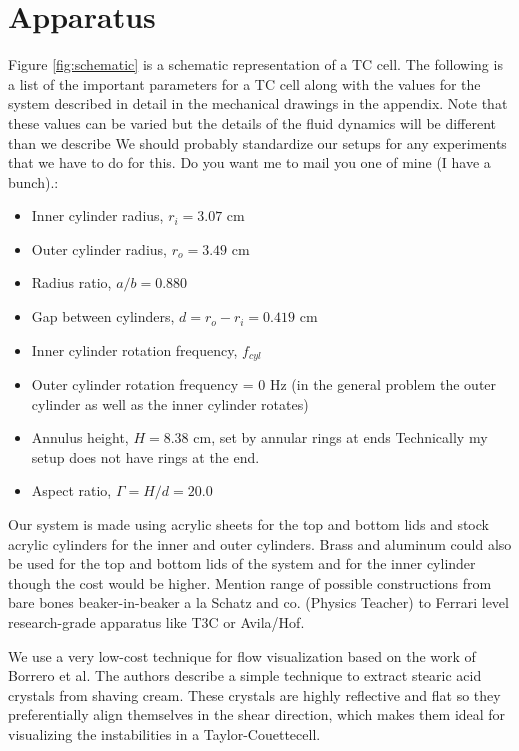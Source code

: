 \documentclass[%
reprint,
 amsmath,amssymb,
 aps,
prb,
floatfix,
longbibliography,
notitlepage
]{revtex4-1}
\newcommand{\DB}[1]{{\color{red}#1}} %
\newcommand{\TC}{Taylor-Couette}
\newcommand{\gap}{\ensuremath{d}} %
\newcommand{\height}{\ensuremath{H}} %
\newcommand{\rad}[1]{\ensuremath{r_{#1}}} %
\newcommand{\aratio}{\ensuremath{\Gamma}} %
\begin{document}
\section{Apparatus}

Figure \ref{fig:schematic} is a schematic representation of a TC cell. The following is a list of the important parameters for a TC cell along with the values for the system described in detail in the mechanical drawings in the appendix. Note that these values can be varied but the details of the fluid dynamics will be different than we describe \DB{We should probably standardize our setups for any experiments that we have to do for this. Do you want me to mail you one of mine (I have a bunch).}:
\begin{itemize}
\item Inner cylinder radius, $\rad{i} = 3.07$ cm
\item Outer cylinder radius, $\rad{o} = 3.49$ cm
\item Radius ratio, $a/b = 0.880 $
\item Gap between cylinders, $\gap = \rad{o}-\rad{i} = 0.419$ cm
\item Inner cylinder rotation frequency, $f_{cyl}$
\item Outer cylinder rotation frequency = 0 Hz (in the general problem the outer cylinder as well as the inner cylinder rotates)
\item Annulus height, $\height= 8.38$ cm, set by annular rings at ends \DB{Technically my setup does not have rings at the end.}
\item Aspect ratio, $\aratio=\height/\gap = 20.0$

\end{itemize}
Our system is made using acrylic sheets for the top and bottom lids and stock acrylic cylinders for the inner and outer cylinders. Brass and aluminum could also be used for the top and bottom lids of the system and for the inner cylinder though the cost would be higher. \DB{Mention range of possible constructions from bare bones beaker-in-beaker a la Schatz and co. (Physics Teacher) to Ferrari level research-grade apparatus like T3C or Avila/Hof.}

We use a very low-cost technique for flow visualization based on the work of Borrero et al.\cite{borrero_2018} The authors describe a simple technique to extract stearic acid crystals from shaving cream. These crystals are highly reflective and flat so they preferentially align themselves in the shear direction, which makes them ideal for visualizing the instabilities in a \TC cell.
\end{document}
